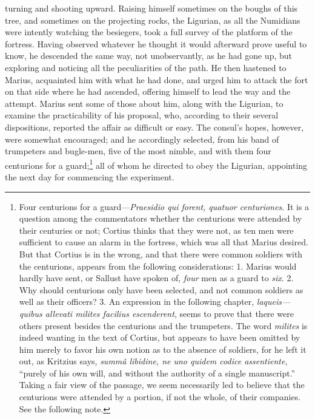 turning and shooting upward. Raising himself sometimes on the boughs
of this tree, and sometimes on the projecting rocks, the Ligurian, as
all the Numidians were intently watching the besiegers, took a full
survey of the platform of the fortress. Having observed whatever he
thought it would afterward prove useful to know, he descended the same
way, not unobservantly, as he had gone up, but exploring and noticing
all the peculiarities of the path. He then hastened to Marius,
acquainted him with what he had done, and urged him to attack the fort
on that side where he had ascended, offering himself to lead the way
and the attempt. Marius sent some of those about him, along with the
Ligurian, to examine the practicability of his proposal, who,
according to their several dispositions, reported the affair as
difficult or easy. The consul's hopes, however, were somewhat
encouraged; and he accordingly selected, from his band of trumpeters
and bugle-men, five of the most nimble, and with them four centurions
for a guard;\footnote{Four centurions for a guard—\emph{Praesidio qui forent, quatuor
centuriones}. It is a question among the commentators whether the
centurions were attended by their centuries or not; Cortius thinks
that they were not, as ten men were sufficient to cause an alarm in
the fortress, which was all that Marius desired. But that Cortius is
in the wrong, and that there were common soldiers with the centurions,
appears from the following considerations: 1. Marius would hardly have
sent, or Sallust have spoken of, \emph{four} men as a guard to \emph{six}. 2.
Why should centurions only have been selected, and not common soldiers
as well as their officers? 3. An expression in the following chapter,
\emph{laqueis—quibus allevati milites facilius escenderent}, seems to
prove that there were others present besides the centurions and the
trumpeters. The word \emph{milites} is indeed wanting in the text of
Cortius, but appears to have been omitted by him merely to favor his
own notion as to the absence of soldiers, for he left it out, as
Kritzius says, \emph{summâ libidine, ne uno quidem codice assentiente},
``purely of his own will, and without the authority of a single
manuscript.'' Taking a fair view of the passage, we seem necessarily
led to believe that the centurions were attended by a portion, if not
the whole, of their companies. See the following note.} all of whom he directed to obey the Ligurian,
appointing the next day for commencing the experiment.

